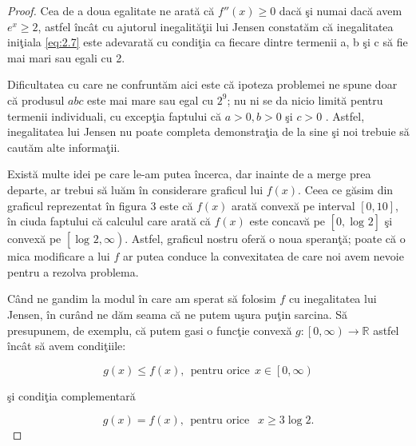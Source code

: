\documentclass[a4paper,12pt,oneside]{report}
\begin{document}
\begin{proof}
Cea de a doua egalitate ne arat\u{a} c\u{a} \({f}''\left ( x \right ) \geq 0\) dac\u{a} \c{s}i numai dac\u{a} avem \(e^{x}\geq 2\), astfel \^{i}nc\^{a}t cu ajutorul inegalit\u{a}\c{t}ii lui Jensen  constat\u{a}m c\u{a} inegalitatea ini\c{t}iala \ref{eq:2.7}  este adevarat\u{a} cu condi\c{t}ia ca fiecare dintre termenii a, b \c{s}i c s\u{a} fie mai mari sau egali cu 2.

Dificultatea cu care ne confrunt\u{a}m aici este c\u{a} ipoteza problemei  ne spune doar  c\u{a} produsul \(abc\) este mai mare sau egal cu \(2^{9}\); nu ni se da nicio  limit\u{a} pentru termenii  individuali, cu excep\c{t}ia faptului c\u{a} \( a > 0, b > 0 \) \c{s}i \(c > 0\) . Astfel, inegalitatea lui Jensen nu poate completa demonstra\c{t}ia de la sine \c{s}i noi trebuie s\u{a} caut\u{a}m alte informa\c{t}ii.

Exist\u{a} multe idei pe care le-am putea \^{i}ncerca, dar inainte de a merge prea departe,  ar trebui s\u{a} lu\u{a}m \^{i}n considerare graficul lui \(f\left ( x \right )\). Ceea ce  g\u{a}sim  din graficul  reprezentat \^{i}n figura 3 este c\u{a} \(f\left ( x \right ) \) arat\u{a} convex\u{a} pe interval \(\left [ 0, 10 \right ]  \), \^{i}n ciuda faptului c\u{a} calculul care arat\u{a} c\u{a} \(f\left ( x \right ) \) este concav\u{a} pe \(\left [ 0, \log _{} 2\right ] \) \c{s}i convex\u{a} pe \(\left [ \log _{} 2 , \infty \right ) \). Astfel, graficul nostru ofer\u{a} o noua speran\c{t}\u{a}; poate c\u{a} o mica modificare a lui \(f\) ar putea conduce la convexitatea de care noi avem nevoie pentru a rezolva problema.

C\^{a}nd ne gandim la modul \^{i}n care am sperat s\u{a} folosim \(f\) cu inegalitatea lui Jensen, \^{i}n cur\^{a}nd ne d\u{a}m seama c\u{a} ne putem u\c{s}ura pu\c{t}in sarcina. S\u{a} presupunem, de exemplu, c\u{a} putem gasi o func\c{t}ie convex\u{a} \(g : \left [ 0 , \infty  \right ) \to \mathbb{R}\) astfel \^{i}nc\^{a}t s\u{a} avem  condi\c{t}iile:

\begin{displaymath}
  g\left ( x \right ) \leq  f\left ( x  \right ),~~ \text{pentru orice}~~ x \in  \left [ 0 , \infty  \right )    \label{eq:2.9} \tag{2.9}
\end{displaymath}

\c{s}i condi\c{t}ia complementar\u{a}

\begin{displaymath}
  g \left ( x \right ) = f \left ( x \right ), ~~ \text{pentru orice }~~  x\geq 3 \log 2. \label{eq:2.10} \tag{2.10}
\end{displaymath}


\end{proof}
\end{document}
